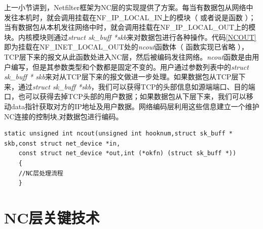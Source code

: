 \par

上一小节讲到，Netfilter框架为NC层的实现提供了方案。每当有数据包从网络中发往本机时，就会调用挂载在NF\_IP\_LOCAL\_IN上的模块（ 或者说是函数 ）；当有数据包从本机发往网络中时，就会调用挂载在NF\_IP\_LOCAL\_OUT上的模块。内核模块则通过\emph{struct sk\_buff *skb}来对数据包进行各种操作。代码\ref{NCOUT}即为挂载在NF\_INET\_LOCAL\_OUT处的\emph{ncout}函数体（ 函数实现已省略 ），TCP层下来的报文从此函数处进入NC层，然后被编码发往网络。\emph{ncout}函数是由用户编写，但是其参数类型和个数都是固定不变的。用户通过参数列表中的\emph{struct sk\_buff * skb}来对从TCP层下来的报文做进一步处理。如果数据包从TCP层下来，通过\emph{struct sk\_buff *skb}，我们可以获得TCP的头部信息如源端端口、目的端口，也可以获得去掉TCP头部的用户数据；如果数据包从下层下来，我们可以移动data指针获取对方的IP地址及用户数据。网络编码层利用这些信息建立一个维护NC连接的控制块,对数据包进行编码。
	\begin{lstlisting}[caption=NF\_INET\_LOCAL\_OUT钩子点函数,label={NCOUT},language={[ANSI]C}]
	static unsigned int ncout(unsigned int hooknum,struct sk_buff * skb,const struct net_device *in,
	const struct net_device *out,int (*okfn) (struct sk_buff *))
	{
	//NC层处理流程	
	} 
	\end{lstlisting}

\section{NC层关键技术}
